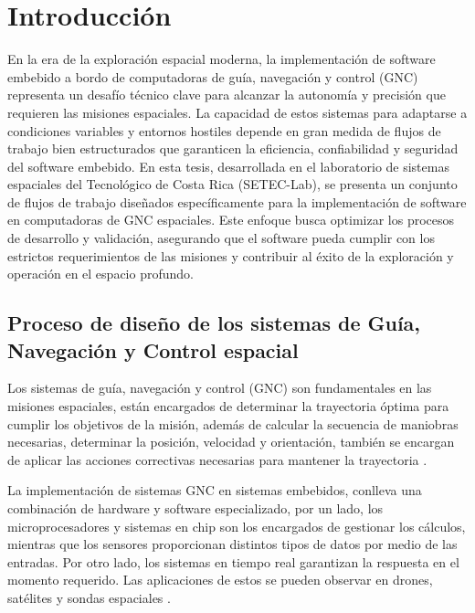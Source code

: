 
\chapter{Introducción}
\label{chp:intro}


En la era de la exploración espacial moderna, la implementación de software embebido a bordo de computadoras de guía, navegación y control (GNC) representa un desafío técnico clave para alcanzar la autonomía y precisión que requieren las misiones espaciales. La capacidad de estos sistemas para adaptarse a condiciones variables y entornos hostiles depende en gran medida de flujos de trabajo bien estructurados que garanticen la eficiencia, confiabilidad y seguridad del software embebido. En esta tesis, desarrollada en el laboratorio de sistemas espaciales del Tecnológico de Costa Rica (SETEC-Lab), se presenta un conjunto de flujos de trabajo diseñados específicamente para la implementación de software en computadoras de GNC espaciales. Este enfoque busca optimizar los procesos de desarrollo y validación, asegurando que el software pueda cumplir con los estrictos requerimientos de las misiones y contribuir al éxito de la exploración y operación en el espacio profundo.

\section{Proceso de diseño de los sistemas de Guía, Navegación y Control espacial}

Los sistemas de guía, navegación y control (GNC) son fundamentales en las misiones espaciales, están encargados de determinar la trayectoria óptima para cumplir los objetivos de la misión, además de calcular la secuencia de maniobras necesarias, determinar la posición, velocidad y orientación, también se encargan de aplicar las acciones correctivas necesarias para mantener la trayectoria \cite{hewing2023enhancing}.

La implementación de sistemas GNC en sistemas embebidos, conlleva una combinación de hardware y software especializado, por un lado, los microprocesadores y sistemas en chip son los encargados de gestionar los cálculos, mientras que los sensores proporcionan distintos tipos de datos por medio de las entradas. Por otro lado, los sistemas en tiempo real garantizan la respuesta en el momento requerido. Las aplicaciones de estos se pueden observar en drones, satélites y sondas espaciales \cite{MathWorks}.

